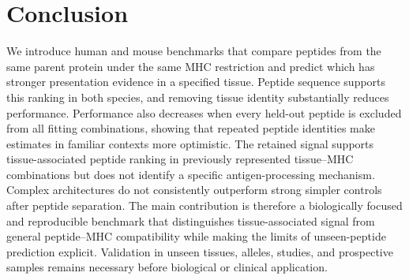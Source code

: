 \section{Conclusion}
We introduce human and mouse benchmarks that compare peptides from the same parent protein under the same MHC restriction and predict which has stronger presentation evidence in a specified tissue. Peptide sequence supports this ranking in both species, and removing tissue identity substantially reduces performance. Performance also decreases when every held-out peptide is excluded from all fitting combinations, showing that repeated peptide identities make estimates in familiar contexts more optimistic. The retained signal supports tissue-associated peptide ranking in previously represented tissue--MHC combinations but does not identify a specific antigen-processing mechanism. Complex architectures do not consistently outperform strong simpler controls after peptide separation. The main contribution is therefore a biologically focused and reproducible benchmark that distinguishes tissue-associated signal from general peptide--MHC compatibility while making the limits of unseen-peptide prediction explicit. Validation in unseen tissues, alleles, studies, and prospective samples remains necessary before biological or clinical application.
